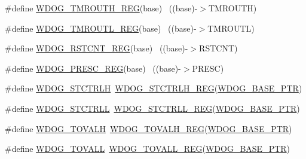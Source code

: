 \begin{DoxyCompactItemize}
\item 
\#define \hyperlink{group___w_d_o_g___register___accessor___macros_ga6c5cca0fc2aeec6d1f8808f55c57acbb}{W\+D\+O\+G\+\_\+\+T\+M\+R\+O\+U\+T\+H\+\_\+\+R\+EG}(base)                                  ~((base)-\/$>$T\+M\+R\+O\+U\+TH)
\item 
\#define \hyperlink{group___w_d_o_g___register___accessor___macros_gaed1d5071ac9fb7f531fdda660780a329}{W\+D\+O\+G\+\_\+\+T\+M\+R\+O\+U\+T\+L\+\_\+\+R\+EG}(base)                                  ~((base)-\/$>$T\+M\+R\+O\+U\+TL)
\item 
\#define \hyperlink{group___w_d_o_g___register___accessor___macros_ga321d566d296ee323809e242077a1c776}{W\+D\+O\+G\+\_\+\+R\+S\+T\+C\+N\+T\+\_\+\+R\+EG}(base)                                    ~((base)-\/$>$R\+S\+T\+C\+NT)
\item 
\#define \hyperlink{group___w_d_o_g___register___accessor___macros_gacbfa99926928928f05da2e4c752ea945}{W\+D\+O\+G\+\_\+\+P\+R\+E\+S\+C\+\_\+\+R\+EG}(base)                                      ~((base)-\/$>$P\+R\+E\+SC)
\item 
\#define \hyperlink{group___w_d_o_g___register___accessor___macros_ga682e2c5e771ae99e572597d5a9ee8620}{W\+D\+O\+G\+\_\+\+S\+T\+C\+T\+R\+LH}~\hyperlink{group___w_d_o_g___register___accessor___macros_gafe3961a26965f4d22fa82eb4a6906efa}{W\+D\+O\+G\+\_\+\+S\+T\+C\+T\+R\+L\+H\+\_\+\+R\+EG}(\hyperlink{group___w_d_o_g___peripheral_ga72fb27c7bc1ae124f180d8f2c7b9fa79}{W\+D\+O\+G\+\_\+\+B\+A\+S\+E\+\_\+\+P\+TR})
\item 
\#define \hyperlink{group___w_d_o_g___register___accessor___macros_gabe98a0873c234c1297e69e1cfb7ebb9e}{W\+D\+O\+G\+\_\+\+S\+T\+C\+T\+R\+LL}~\hyperlink{group___w_d_o_g___register___accessor___macros_gab5f636177e7295761f4d366fc6f2d9c5}{W\+D\+O\+G\+\_\+\+S\+T\+C\+T\+R\+L\+L\+\_\+\+R\+EG}(\hyperlink{group___w_d_o_g___peripheral_ga72fb27c7bc1ae124f180d8f2c7b9fa79}{W\+D\+O\+G\+\_\+\+B\+A\+S\+E\+\_\+\+P\+TR})
\item 
\#define \hyperlink{group___w_d_o_g___register___accessor___macros_ga64a1039724acdbacf39352885a760505}{W\+D\+O\+G\+\_\+\+T\+O\+V\+A\+LH}~\hyperlink{group___w_d_o_g___register___accessor___macros_gaa18bf2a6abf1641d711ee0a8e963d704}{W\+D\+O\+G\+\_\+\+T\+O\+V\+A\+L\+H\+\_\+\+R\+EG}(\hyperlink{group___w_d_o_g___peripheral_ga72fb27c7bc1ae124f180d8f2c7b9fa79}{W\+D\+O\+G\+\_\+\+B\+A\+S\+E\+\_\+\+P\+TR})
\item 
\#define \hyperlink{group___w_d_o_g___register___accessor___macros_ga1ed33751ec9e2b0d17178c1acaf264b7}{W\+D\+O\+G\+\_\+\+T\+O\+V\+A\+LL}~\hyperlink{group___w_d_o_g___register___accessor___macros_gaf4ebf9d6344af3fa4c4cf0219a334dac}{W\+D\+O\+G\+\_\+\+T\+O\+V\+A\+L\+L\+\_\+\+R\+EG}(\hyperlink{group___w_d_o_g___peripheral_ga72fb27c7bc1ae124f180d8f2c7b9fa79}{W\+D\+O\+G\+\_\+\+B\+A\+S\+E\+\_\+\+P\+TR})

\end{DoxyCompactItemize}
